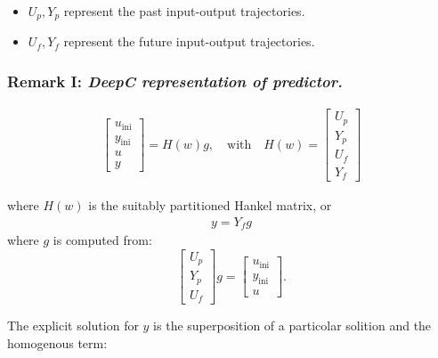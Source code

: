 \documentclass[12pt, a4paper]{article}
\begin{document}
\begin{itemize}
    \item \( U_p, Y_p \) represent the past input-output trajectories.
    \item \( U_f, Y_f \) represent the future input-output trajectories.
\end{itemize}

\subsubsection{Remark I: \textit{DeepC representation of predictor.}}

\begin{align}
    \begin{bmatrix}
        u_{\text{ini}} \\
        y_{\text{ini}} \\
        u \\
        y
        \end{bmatrix}
        = H(w) g,  \quad \text{with} \quad 
            H(w) =
            \begin{bmatrix}
            U_p \\
            Y_p \\
            U_f \\
            Y_f
            \end{bmatrix}
\end{align}

where \( H(w) \) is the suitably partitioned Hankel matrix, or 
\begin{align}
    y = Y_f g
\end{align}
where \( g \) is computed from:
\[
\begin{bmatrix}
U_p \\
Y_p \\
U_f
\end{bmatrix} g = 
\begin{bmatrix}
u_{\text{ini}} \\
y_{\text{ini}} \\
u
\end{bmatrix}.
\]

\noindent The explicit solution for \( y \) is the superposition of a particolar solition and the homogenous term:
\end{document}
